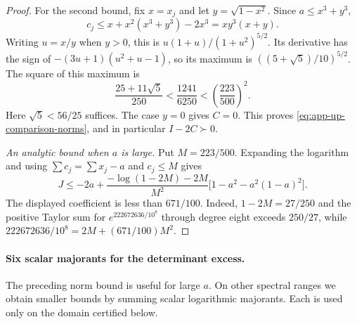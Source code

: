 \documentclass[11pt,a4paper]{article}
\numberwithin{equation}{section}
\begin{document}
\begin{proof}
For the second bound, fix $x=x_j$ and let $y=\sqrt{1-x^2}$.
Since $a\le x^3+y^3$,
\[
 c_j\le x+x^2(x^3+y^3)-2x^3=xy^3(x+y).
\]
Writing $u=x/y$ when $y>0$, this is
$u(1+u)/(1+u^2)^{5/2}$.
Its derivative has the sign of $-(3u+1)(u^2+u-1)$, so its maximum is
$((5+\sqrt5)/10)^{5/2}$.
The square of this maximum is
\[
 \frac{25+11\sqrt5}{250}<\frac{1241}{6250}
 <\left(\frac{223}{500}\right)^2.
\]
Here $\sqrt5<56/25$ suffices. The case $y=0$ gives $C=0$.
This proves \eqref{eq:app-up-comparison-norms}, and in particular
$I-2C\succ0$.

\emph{An analytic bound when $a$ is large.}
Put $M=223/500$. Expanding the logarithm and using
$\sum c_j=\sum x_j-a$ and $c_j\le M$ gives
\[
 J\le-2a+
 \frac{-\log(1-2M)-2M}{M^2}\bigl[1-a^2-a^2(1-a)^2\bigr].
\]
The displayed coefficient is less than $671/100$.
Indeed, $1-2M=27/250$ and the positive Taylor sum for
$e^{222672636/10^8}$ through degree eight exceeds $250/27$, while
$222672636/10^8=2M+(671/100)M^2$.
\end{proof}

\paragraph{Six scalar majorants for the determinant excess.}
The preceding norm bound is useful for large $a$. On other spectral
ranges we obtain smaller bounds by summing scalar logarithmic majorants.
Each is used only on the domain certified below.
\end{document}
